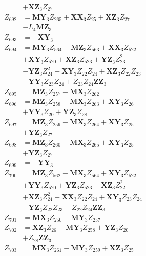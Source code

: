 \begin{multicols}{2}
\begin{align}
&+ \mathbf{XZ}_3Z_{27} \nonumber \\
Z_{692} &= \mathbf{MY}_3Z_{265} + \mathbf{XX}_3Z_{25} + \mathbf{XZ}_3Z_{27}  \nonumber \\
&- L_4\mathbf{MZ}_3 \nonumber \\
Z_{693} &= -\mathbf{XY}_3 \nonumber \\
Z_{694} &= \mathbf{MY}_3Z_{564} - \mathbf{MZ}_3Z_{563} + \mathbf{XX}_3Z_{522}  \nonumber \\
&+ \mathbf{XY}_3Z_{520} + \mathbf{XZ}_3Z_{523} + \mathbf{YZ}_3Z_{23}^2  \nonumber \\
&- \mathbf{YZ}_3Z_{24}^2 - \mathbf{XY}_3Z_{22}Z_{24} + \mathbf{XZ}_3Z_{22}Z_{23}  \nonumber \\
&- \mathbf{YY}_3Z_{23}Z_{24} + Z_{23}Z_{24}\mathbf{ZZ}_3 \nonumber \\
Z_{695} &= \mathbf{MZ}_3Z_{257} - \mathbf{MX}_3Z_{262} \nonumber \\
Z_{696} &= \mathbf{MZ}_3Z_{258} - \mathbf{MX}_3Z_{263} + \mathbf{XY}_3Z_{26}  \nonumber \\
&+ \mathbf{YY}_3Z_{20} + \mathbf{YZ}_3Z_{28} \nonumber \\
Z_{697} &= \mathbf{MZ}_3Z_{259} - \mathbf{MX}_3Z_{264} + \mathbf{XY}_3Z_{25}  \nonumber \\
&+ \mathbf{YZ}_3Z_{27} \nonumber \\
Z_{698} &= \mathbf{MZ}_3Z_{260} - \mathbf{MX}_3Z_{265} + \mathbf{XY}_3Z_{25}  \nonumber \\
&+ \mathbf{YZ}_3Z_{27} \nonumber \\
Z_{699} &= -\mathbf{YY}_3 \nonumber \\
Z_{700} &= \mathbf{MZ}_3Z_{562} - \mathbf{MX}_3Z_{564} + \mathbf{XY}_3Z_{522}  \nonumber \\
&+ \mathbf{YY}_3Z_{520} + \mathbf{YZ}_3Z_{523} - \mathbf{XZ}_3Z_{22}^2  \nonumber \\
&+ \mathbf{XZ}_3Z_{24}^2 + \mathbf{XX}_3Z_{22}Z_{24} + \mathbf{XY}_3Z_{23}Z_{24}  \nonumber \\
&- \mathbf{YZ}_3Z_{22}Z_{23} - Z_{22}Z_{24}\mathbf{ZZ}_3 \nonumber \\
Z_{701} &= \mathbf{MX}_3Z_{250} - \mathbf{MY}_3Z_{257} \nonumber \\
Z_{702} &= \mathbf{XZ}_3Z_{26} - \mathbf{MY}_3Z_{258} + \mathbf{YZ}_3Z_{20}  \nonumber \\
&+ Z_{28}\mathbf{ZZ}_3 \nonumber \\
Z_{703} &= \mathbf{MX}_3Z_{261} - \mathbf{MY}_3Z_{259} + \mathbf{XZ}_3Z_{25}  \nonumber \\

\end{align}
\end{multicols}
